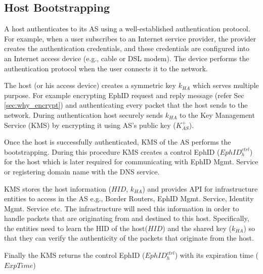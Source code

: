 \subsection{Host Bootstrapping}
A host authenticates to its AS using a well-established authentication protocol. For example, when a user subscribes to an Internet service provider, the provider creates the authentication credentials, and these credentials are configured into an Internet access device (e.g., cable or DSL modem). The device performs the authentication protocol when the user connects it to the network.

The host (or his access device) creates a symmetric key $k_{HA}$ which serves multiple purpose. For example encrypting EphID request and reply message (refer Sec \ref{sec:why_encrypt}) and authenticating every packet that the host sends to the network. During authentication host securely sends $k_{HA}$ to the Key Management Service (KMS) by encrypting it using AS's public key ($K^{+}_{AS}$). 

Once the host is successfully authenticated, KMS of the AS performs the bootstrapping. During this procedure KMS creates a control EphID ($EphID_{h}^{ctrl}$) for the host which is later required for communicating with EphID Mgmt. Service or registering domain name with the DNS service. 

KMS stores the host information ($HID$, $k_{HA}$) and provides API for infrastructure entities to access in the AS e.g., Border Routers, EphID Mgmt. Service, Identity Mgmt. Service etc. The infrastructure will need this information in order to handle packets that are originating from and destined to this host. Specifically, the entities need to learn the HID of the host($HID$) and the shared key ($k_{HA}$) so that they can verify the authenticity of the packets that originate from the host.

Finally the KMS returns the control EphID ($EphID_{h}^{ctrl}$) with its expiration time ($ExpTime$)

